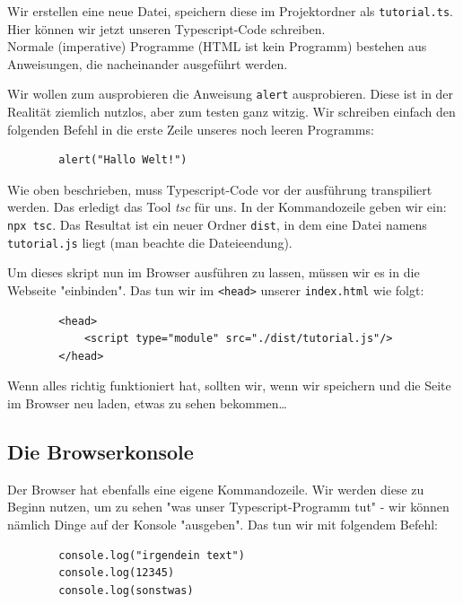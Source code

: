 \documentclass[11pt]{article}
\begin{document}
    Wir erstellen eine neue Datei, speichern diese im Projektordner als \Verb"tutorial.ts".
    Hier können wir jetzt unseren Typescript-Code schreiben. \\

    Normale (imperative) Programme (HTML ist kein Programm) bestehen aus Anweisungen,
    die nacheinander ausgeführt werden.

    Wir wollen zum ausprobieren die Anweisung \Verb"alert" ausprobieren.
    Diese ist in der Realität ziemlich nutzlos, aber zum testen ganz witzig.
    Wir schreiben einfach den folgenden Befehl in die erste Zeile unseres noch leeren Programms:

    \begin{verbatim}
        alert("Hallo Welt!")
    \end{verbatim}

    Wie oben beschrieben, muss Typescript-Code vor der ausführung transpiliert werden.
    Das erledigt das Tool \textit{tsc} für uns.
    In der Kommandozeile geben wir ein: \Verb"npx tsc".
    Das Resultat ist ein neuer Ordner \Verb"dist", in dem eine Datei namens \Verb"tutorial.js" liegt
    (man beachte die Dateieendung).

    Um dieses skript nun im Browser ausführen zu lassen, müssen wir es in die Webseite "einbinden".
    Das tun wir im \Verb"<head>" unserer \Verb"index.html" wie folgt:

    \begin{verbatim}
        <head>
            <script type="module" src="./dist/tutorial.js"/>
        </head>
    \end{verbatim}

    Wenn alles richtig funktioniert hat, sollten wir, wenn wir speichern und die Seite im Browser neu laden, etwas zu
    sehen bekommen\dots

    \subsection{Die Browserkonsole}

    Der Browser hat ebenfalls eine eigene Kommandozeile.
    Wir werden diese zu Beginn nutzen, um zu sehen "was unser Typescript-Programm tut" - wir können nämlich
    Dinge auf der Konsole "ausgeben".
    Das tun wir mit folgendem Befehl:

    \begin{verbatim}
        console.log("irgendein text")
        console.log(12345)
        console.log(sonstwas)
    \end{verbatim}
\end{document}
